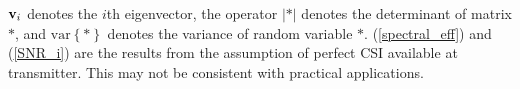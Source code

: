 \documentclass[conference]{IEEEtran}
\newcommand{\bv}{{\bf v}}
\begin{document}
\noindent $\bv_{i}$ denotes the $i$th eigenvector, the operator
$\left|\ast\right|$ denotes the determinant of matrix $\ast$, and
$\mbox{var}\left\{\ast\right\}$ denotes the variance of random
variable $\ast$. (\ref{spectral_eff}) and (\ref{SNR_i}) are the
results from the assumption of perfect CSI available at
transmitter. This may not be consistent with practical
applications.
\begin{figure}
\end{figure}
\end{document}
